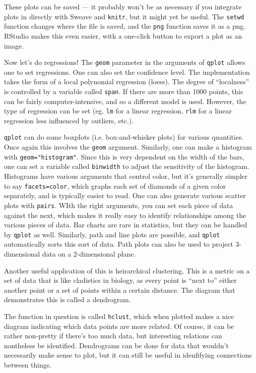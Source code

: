 These plots can be saved --- it probably won't be as necessary if you integrate plots in directly with Sweave and \texttt{knitr}, but it might yet be useful. The \texttt{setwd} function changes where the file is saved, and the \texttt{png} function saves it as a png. RStudio makes this even easier, with a one-click button to export a plot as an image.

Now let's do regressions! The \texttt{geom} parameter in the arguments of \texttt{qplot} allows one to set regressions. One can also set the confidence level. The implementation takes the form of a local polynomial regression (loess). The degree of ``localness'' is controlled by a variable called \texttt{span}. If there are more than 1000 points, this can be fairly computer-intensive, and so a different model is used. However, the type of regression can be set (eg. \texttt{lm} for a linear regression, \texttt{rlm} for a linear regression less influenced by outliers, etc.).

\texttt{qplot} can do some boxplots (i.e. box-and-whisker plots) for various quantities. Once again this involves the \texttt{geom} argument. Similarly, one can make a histogram with \texttt{geom="histogram"}. Since this is very dependent on the width of the bars, one can set a variable called \texttt{binwidth} to adjust the sensitivity of the histogram. Histograms have various arguments that control color, but it's generally simpler to say \texttt{facets=color}, which graphs each set of diamonds of a given color separately, and is typically easier to read. One can also generate various scatter plots with \texttt{pairs}. WIth the right arguments, you can set each piece of data against the next, which makes it really easy to identify relationships among the various pieces of data. Bar charts are rare in statistics, but they can be handled by \texttt{qplot} as well. Similarly, path and line plots are possible, and \texttt{qplot} automatically sorts this sort of data. Path plots can also be used to project 3-dimensional data on a 2-dimensional plane.

Another useful application of this is heirarchical clustering. This is a metric on a set of data that is like cladistics in biology, as every point is ``next to'' either another point or a set of points within a certain distance. The diagram that demonstrates this is called a dendrogram.

The function in question is called \texttt{hclust}, which when plotted makes a nice diagram indicating which data points are more related. Of course, it can be rather non-pretty if there's too much data, but interesting relations can nontheless be identified. Dendrograms can be done for data that wouldn't necessarily make sense to plot, but it can still be useful in idenfifying connections between things.

